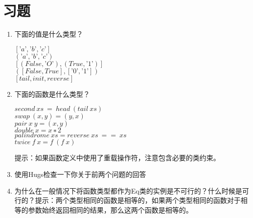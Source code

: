 \section{习题}

\begin{enumerate}
\item 下面的值是什么类型？

\noindent\hspace*{1cm} $[’a’, ’b’, ’c’]$\\
\hspace*{1cm} $(’a’, ’b’, ’c’)$\\
\hspace*{1cm} $[(False, ’O’), (True, ’1’)]$\\
\hspace*{1cm} $([False, True ], [’0’, ’1’])$\\
\hspace*{1cm} $[tail , init, reverse ]$

\item 下面的函数是什么类型？

\noindent\hspace*{1cm} $second~xs~=~head~(tail~xs)$\\
\hspace*{1cm} $swap~(x , y) = (y, x )$\\
\hspace*{1cm} $pair~x~y = (x , y)$\\
\hspace*{1cm} $double~x = x ∗2$\\
\hspace*{1cm} $palindrome~xs = reverse~xs~==~xs$\\
\hspace*{1cm} $twice~f~x = f~(f~x )$

提示：如果函数定义中使用了重载操作符，注意包含必要的类约束。

\item 使用Hugs检查一下你关于前两个问题的回答

\item 为什么在一般情况下将函数类型都作为Eq类的实例是不可行的？什么时候是可行的？提示：两个类型相同的函数是相等的，如果两个类型相同的函数对于相等的参数始终返回相同的结果，那么这两个函数是相等的。

\end{enumerate}
